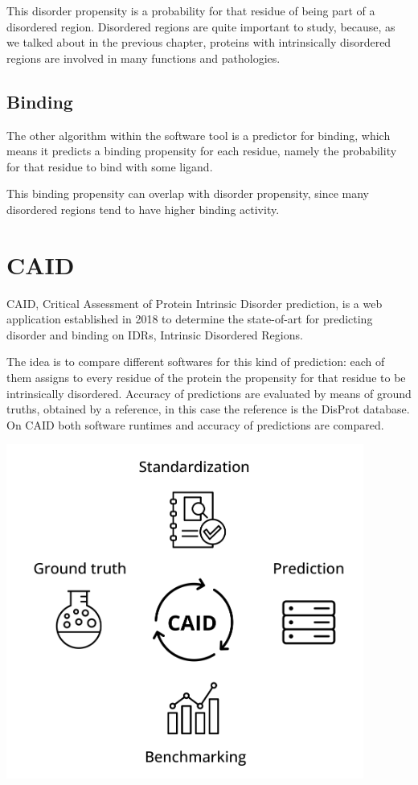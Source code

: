 This disorder propensity is a probability for that residue of being part of a disordered region. Disordered regions are quite important to study, because, as we talked about in the previous chapter, proteins with intrinsically disordered regions are involved in many functions and pathologies.

\subsection{Binding}
The other algorithm within the software tool is a predictor for binding, which means it predicts a binding propensity for each residue, namely the probability for that residue to bind with some ligand.

This binding propensity can overlap with disorder propensity, since many disordered regions tend to have higher binding activity.

\section{CAID}
CAID, Critical Assessment of Protein Intrinsic Disorder prediction, is a web application established in 2018 to determine the state-of-art for predicting disorder and binding on IDRs, Intrinsic Disordered Regions. 

The idea is to compare different softwares for this kind of prediction: each of them assigns to every residue of the protein the propensity for that residue to be intrinsically disordered. Accuracy of predictions are evaluated by means of ground truths, obtained by a reference, in this case the reference is the DisProt database. On CAID both software runtimes and accuracy of predictions are compared.

\includegraphics[scale=.5]{res/caid_cycle.png}

